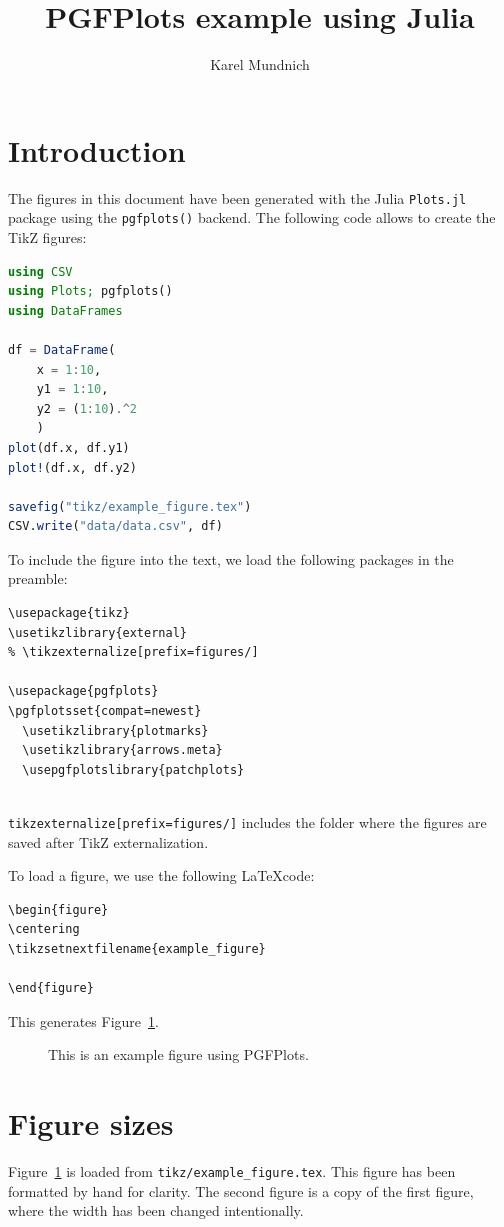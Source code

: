 \documentclass[9ptm,twocolumn]{article}
\title{PGFPlots example using Julia}
\author{Karel Mundnich}
\date{}
\begin{document}
\maketitle
\tikzexternaldisable

\section{Introduction}
The figures in this document have been generated with the Julia \texttt{Plots.jl} package using the \texttt{pgfplots()} backend. The following code allows to create the TikZ figures:
\begin{lstlisting}[language=Julia]
using CSV
using Plots; pgfplots()
using DataFrames

df = DataFrame(
	x = 1:10,
	y1 = 1:10,
	y2 = (1:10).^2
	)
plot(df.x, df.y1)
plot!(df.x, df.y2)

savefig("tikz/example_figure.tex")
CSV.write("data/data.csv", df)
\end{lstlisting}

To include the figure into the text, we load the following packages in the preamble:
\begin{verbatim}
\usepackage{tikz}
\usetikzlibrary{external}
% \tikzexternalize[prefix=figures/]

\usepackage{pgfplots}
\pgfplotsset{compat=newest}
  \usetikzlibrary{plotmarks}
  \usetikzlibrary{arrows.meta}
  \usepgfplotslibrary{patchplots}
\end{verbatim}
\texttt{\\tikzexternalize[prefix=figures/]} includes the folder where the figures are saved after TikZ externalization.

To load a figure, we use the following \LaTeX code:

\begin{verbatim}
\begin{figure}
\centering
\tikzsetnextfilename{example_figure}

\end{figure}
\end{verbatim}

This generates Figure~\ref{fig:example}.

\begin{figure}
\centering
{}

\caption{This is an example figure using PGFPlots.}
\label{fig:example}
\end{figure}

\section{Figure sizes}
Figure~\ref{fig:example} is loaded from \texttt{tikz/example\_figure.tex}. This figure has been formatted by hand for clarity. The second figure is a copy of the first figure, where the width has been changed intentionally.
\end{document}
